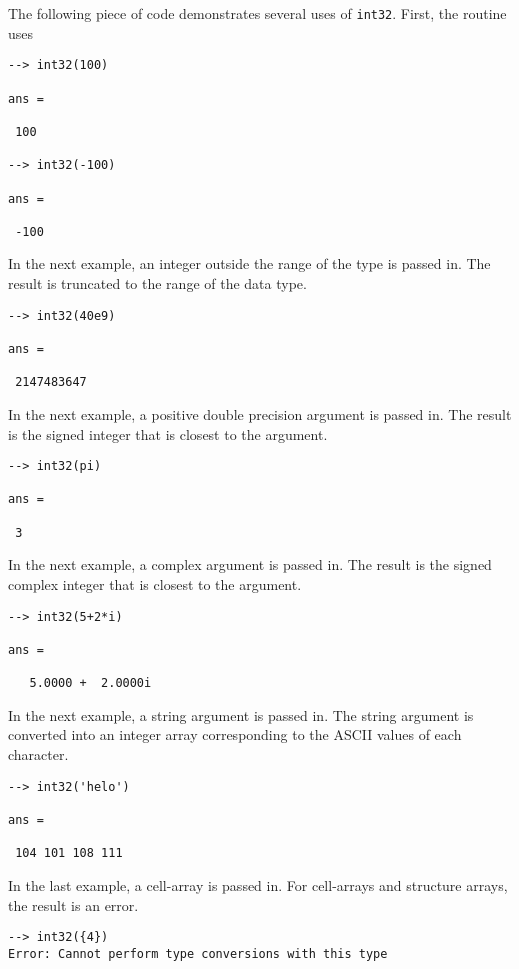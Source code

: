 The following piece of code demonstrates several uses of \verb|int32|.  First, the routine uses
\begin{verbatim}
--> int32(100)

ans = 

 100 

--> int32(-100)

ans = 

 -100 
\end{verbatim}
In the next example, an integer outside the range  of the type is passed in.  The 
result is truncated to the range of the data type.
\begin{verbatim}
--> int32(40e9)

ans = 

 2147483647 
\end{verbatim}
In the next example, a positive double precision argument is passed in.  The 
result is the signed integer that is closest to the argument.
\begin{verbatim}
--> int32(pi)

ans = 

 3 
\end{verbatim}
In the next example, a complex argument is passed in.  The result is the signed 
complex integer that is closest to the argument.
\begin{verbatim}
--> int32(5+2*i)

ans = 

   5.0000 +  2.0000i 
\end{verbatim}
In the next example, a string argument is passed in.  The string argument is 
converted into an integer array corresponding to the ASCII values of each character.
\begin{verbatim}
--> int32('helo')

ans = 

 104 101 108 111 
\end{verbatim}
In the last example, a cell-array is passed in.  For cell-arrays and structure 
arrays, the result is an error.
\begin{verbatim}
--> int32({4})
Error: Cannot perform type conversions with this type
\end{verbatim}
